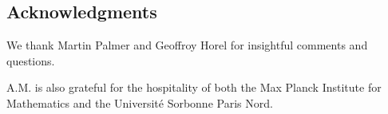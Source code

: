 
\subsection*{Acknowledgments}

We thank Martin Palmer and Geoffroy Horel for insightful comments and questions.

A.M. is also grateful for the hospitality of both the Max Planck Institute for Mathematics and the Universit\'e Sorbonne Paris Nord.